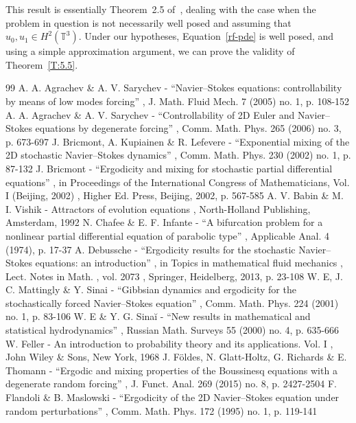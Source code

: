\documentclass[11pt]{article}
\theoremstyle{plain}
\theoremstyle{definition}
\theoremstyle{plain}
\numberwithin{equation}{section}
\newcommand{\T}{{\mathbb T}}
\begin{document}
This result is essentially Theorem~2.5 of~\cite{nersesyan-2020}, dealing with the case when the problem in question is not necessarily well posed and assuming that $u_0,u_1\in H^2(\T^3)$. Under our hypotheses, Equation~\eqref{rf-pde} is well posed, and using a simple approximation argument, we can prove the validity of Theorem~\ref{T:5.5}.



\begin{thebibliography}{99}
 A. A. Agrachev \& A. V. Sarychev - “Navier–Stokes equations: controllability by means of low modes forcing” , J. Math. Fluid Mech. 7 (2005) no. 1, p. 108-152
 A. A. Agrachev \& A. V. Sarychev - “Controllability of 2D Euler and Navier–Stokes equations by degenerate forcing” , Comm. Math. Phys. 265 (2006) no. 3, p. 673-697
 J. Bricmont, A. Kupiainen \& R. Lefevere - “Exponential mixing of the 2D stochastic Navier–Stokes dynamics” , Comm. Math. Phys. 230 (2002) no. 1, p. 87-132
 J. Bricmont - “Ergodicity and mixing for stochastic partial differential equations” , in Proceedings of the International Congress of Mathematicians, Vol. I (Beijing, 2002) , Higher Ed. Press, Beijing, 2002, p. 567-585
 A. V. Babin \& M. I. Vishik - Attractors of evolution equations , North-Holland Publishing, Amsterdam, 1992
 N. Chafee \& E. F. Infante - “A bifurcation problem for a nonlinear partial differential equation of parabolic type” , Applicable Anal. 4 (1974), p. 17-37
 A. Debussche - “Ergodicity results for the stochastic Navier–Stokes equations: an introduction” , in Topics in mathematical fluid mechanics , Lect. Notes in Math. , vol. 2073 , Springer, Heidelberg, 2013, p. 23-108
 W. E, J. C. Mattingly \& Y. Sinai - “Gibbsian dynamics and ergodicity for the stochastically forced Navier–Stokes equation” , Comm. Math. Phys. 224 (2001) no. 1, p. 83-106
 W. E \& Y. G. Sinaĭ - “New results in mathematical and statistical hydrodynamics” , Russian Math. Surveys 55 (2000) no. 4, p. 635-666
 W. Feller - An introduction to probability theory and its applications. Vol. I , John Wiley \& Sons, New York, 1968
 J. Földes, N. Glatt-Holtz, G. Richards \& E. Thomann - “Ergodic and mixing properties of the Boussinesq equations with a degenerate random forcing” , J. Funct. Anal. 269 (2015) no. 8, p. 2427-2504
 F. Flandoli \& B. Maslowski - “Ergodicity of the 2D Navier–Stokes equation under random perturbations” , Comm. Math. Phys. 172 (1995) no. 1, p. 119-141

\end{thebibliography}
\end{document}
